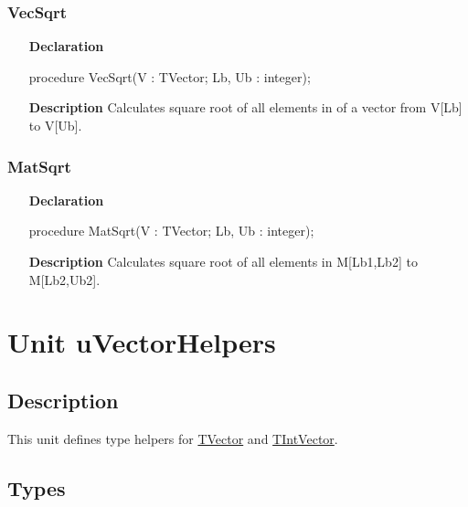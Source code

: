\documentclass[12pt,a4paper,oneside]{report}
\newcommand{\lmath}[1]{   %
	\marginpar{\vspace{#1} 
		\begin{flushright}
			LMath
	\end{flushright} }
}
\newcommand{\declarationitem}[1]{\textbf{#1}}
\newcommand{\descriptiontitle}[1]{\textbf{#1}}
\begin{document}
\subsubsection{VecSqrt}
\label{uvecfunc:VecSqrt}
\begin{itemize}
	\item[\declarationitem{Declaration}\hfill]
	\begin{flushleft}
procedure VecSqrt(V : TVector; Lb, Ub : integer); 
	\end{flushleft}
	\item[\descriptiontitle{Description}\hfill]
		Calculates square root of all elements in of a vector from V[Lb] to V[Ub].
\end{itemize}
\subsubsection{MatSqrt}
\label{uvecfunc:MatSqrt}
\begin{itemize}
	\item[\declarationitem{Declaration}\hfill]
	\begin{flushleft}
		procedure MatSqrt(V : TVector; Lb, Ub : integer); 
	\end{flushleft}
	\item[\descriptiontitle{Description}\hfill]
		Calculates square root of all elements in M[Lb1,Lb2] to M[Lb2,Ub2].
\end{itemize}

\section{Unit uVectorHelpers}\label{sec:unit-uvectorhelpers}
\lmath{-28pt}
\subsection{Description}
This unit defines type helpers for \hyperref[utypes-TVector]{TVector} and \hyperref[utypes-TIntVector]{TIntVector}.
\subsection{Types}
\end{document}
